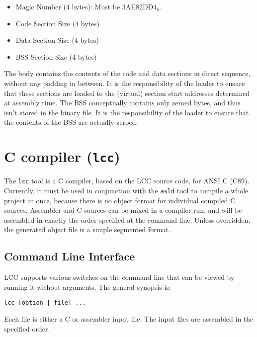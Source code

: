\begin{itemize}
\item Magic Number (4 bytes): Must be 3AE82DD4$_h$.
\item Code Section Size (4 bytes)
\item Data Section Size (4 bytes)
\item BSS Section Size (4 bytes)
\end{itemize}

The body contains the contents of the code and data sections in direct sequence, without any padding in between. It is the responsibility of the loader to ensure that these sections are loaded to the (virtual) section start addresses determined at assembly time. The BSS conceptually contains only zeroed bytes, and thus isn't stored in the binary file. It is the responsibility of the loader to ensure that the contents of the BSS are actually zeroed.

\section{C compiler ({\tt lcc})}

The {\tt lcc} tool is a C compiler, based on the LCC source code, for ANSI C (C89). Currently, it must be used in conjunction with the {\tt asld} tool to compile a whole project at once, because there is no object format for individual compiled C sources. Assembler and C sources can be mixed in a compiler run, and will be assembled in exactly the order specified at the command line. Unless overridden, the generated object file is a simple segmented format.

\subsection{Command Line Interface}

LCC supports various switches on the command line that can be viewed by running it without arguments. The general synopsis is:

{\tt lcc [option | file] ...}

Each file is either a C or assembler input file. The input files are assembled in the specified order.

